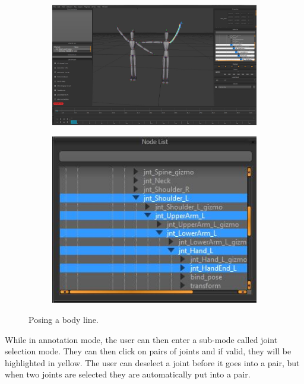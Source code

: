 \begin{figure}[H]
	\centering
        \begin{subfigure}[b!]{0.45\textwidth}
        	\centering
                \includegraphics[width=\linewidth]{img/ui3}
        \end{subfigure}
        \quad
        \begin{subfigure}[b!]{0.45\textwidth}
        	\centering
                \includegraphics[width=\linewidth]{img/ui4}
        \end{subfigure}%
        \caption{Posing a body line.}
	\label{fig:posingbl}
\end{figure}

While in annotation mode, the user can then enter a sub-mode called joint selection mode. They can then click on pairs of joints and if valid, they will be highlighted in yellow. The user can deselect a joint before it goes into a pair, but when two joints are selected they are automatically put into a pair.


